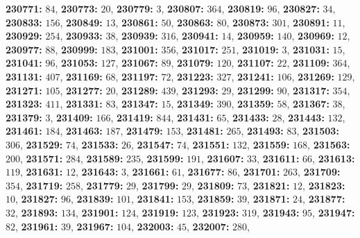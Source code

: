 \textsf{\bfseries 230771:} $84$, \textsf{\bfseries 230773:} $20$, \textsf{\bfseries 230779:} $3$, \textsf{\bfseries 230807:} $364$, \textsf{\bfseries 230819:} $96$, \textsf{\bfseries 230827:} $34$, \textsf{\bfseries 230833:} $156$, \textsf{\bfseries 230849:} $13$, \textsf{\bfseries 230861:} $50$, \textsf{\bfseries 230863:} $80$, \textsf{\bfseries 230873:} $301$, \textsf{\bfseries 230891:} $11$, \textsf{\bfseries 230929:} $254$, \textsf{\bfseries 230933:} $38$, \textsf{\bfseries 230939:} $316$, \textsf{\bfseries 230941:} $14$, \textsf{\bfseries 230959:} $140$, \textsf{\bfseries 230969:} $12$, \textsf{\bfseries 230977:} $88$, \textsf{\bfseries 230999:} $183$, \textsf{\bfseries 231001:} $356$, \textsf{\bfseries 231017:} $251$, \textsf{\bfseries 231019:} $3$, \textsf{\bfseries 231031:} $15$, \textsf{\bfseries 231041:} $96$, \textsf{\bfseries 231053:} $127$, \textsf{\bfseries 231067:} $89$, \textsf{\bfseries 231079:} $120$, \textsf{\bfseries 231107:} $22$, \textsf{\bfseries 231109:} $364$, \textsf{\bfseries 231131:} $407$, \textsf{\bfseries 231169:} $68$, \textsf{\bfseries 231197:} $72$, \textsf{\bfseries 231223:} $327$, \textsf{\bfseries 231241:} $106$, \textsf{\bfseries 231269:} $129$, \textsf{\bfseries 231271:} $105$, \textsf{\bfseries 231277:} $20$, \textsf{\bfseries 231289:} $439$, \textsf{\bfseries 231293:} $29$, \textsf{\bfseries 231299:} $90$, \textsf{\bfseries 231317:} $354$, \textsf{\bfseries 231323:} $411$, \textsf{\bfseries 231331:} $83$, \textsf{\bfseries 231347:} $15$, \textsf{\bfseries 231349:} $390$, \textsf{\bfseries 231359:} $58$, \textsf{\bfseries 231367:} $38$, \textsf{\bfseries 231379:} $3$, \textsf{\bfseries 231409:} $166$, \textsf{\bfseries 231419:} $844$, \textsf{\bfseries 231431:} $65$, \textsf{\bfseries 231433:} $28$, \textsf{\bfseries 231443:} $132$, \textsf{\bfseries 231461:} $184$, \textsf{\bfseries 231463:} $187$, \textsf{\bfseries 231479:} $153$, \textsf{\bfseries 231481:} $265$, \textsf{\bfseries 231493:} $83$, \textsf{\bfseries 231503:} $306$, \textsf{\bfseries 231529:} $74$, \textsf{\bfseries 231533:} $26$, \textsf{\bfseries 231547:} $74$, \textsf{\bfseries 231551:} $132$, \textsf{\bfseries 231559:} $168$, \textsf{\bfseries 231563:} $200$, \textsf{\bfseries 231571:} $284$, \textsf{\bfseries 231589:} $235$, \textsf{\bfseries 231599:} $191$, \textsf{\bfseries 231607:} $33$, \textsf{\bfseries 231611:} $66$, \textsf{\bfseries 231613:} $119$, \textsf{\bfseries 231631:} $12$, \textsf{\bfseries 231643:} $3$, \textsf{\bfseries 231661:} $61$, \textsf{\bfseries 231677:} $86$, \textsf{\bfseries 231701:} $263$, \textsf{\bfseries 231709:} $354$, \textsf{\bfseries 231719:} $258$, \textsf{\bfseries 231779:} $29$, \textsf{\bfseries 231799:} $29$, \textsf{\bfseries 231809:} $73$, \textsf{\bfseries 231821:} $12$, \textsf{\bfseries 231823:} $10$, \textsf{\bfseries 231827:} $96$, \textsf{\bfseries 231839:} $101$, \textsf{\bfseries 231841:} $153$, \textsf{\bfseries 231859:} $39$, \textsf{\bfseries 231871:} $24$, \textsf{\bfseries 231877:} $32$, \textsf{\bfseries 231893:} $134$, \textsf{\bfseries 231901:} $124$, \textsf{\bfseries 231919:} $123$, \textsf{\bfseries 231923:} $319$, \textsf{\bfseries 231943:} $95$, \textsf{\bfseries 231947:} $82$, \textsf{\bfseries 231961:} $39$, \textsf{\bfseries 231967:} $104$, \textsf{\bfseries 232003:} $45$, \textsf{\bfseries 232007:} $280$, 
